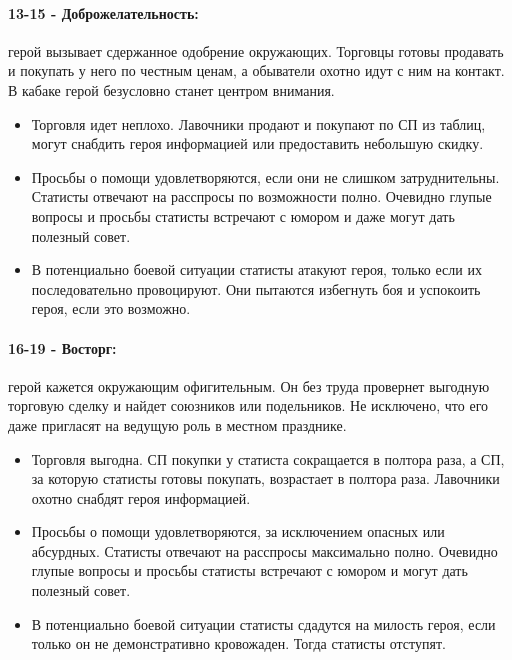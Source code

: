 \paragraph{13-15 - Доброжелательность:} герой вызывает сдержанное одобрение окружающих. Торговцы готовы продавать и покупать у него по честным ценам, а обыватели охотно идут с ним на контакт. В кабаке герой безусловно станет центром внимания.
\begin{itemize}
  \item Торговля идет неплохо. Лавочники продают и покупают по СП из таблиц, могут снабдить героя информацией или предоставить небольшую скидку.
  \item Просьбы о помощи удовлетворяются, если они не слишком затруднительны. Статисты отвечают на расспросы по возможности полно. Очевидно глупые вопросы и просьбы статисты встречают с юмором и даже могут дать полезный совет.
  \item В потенциально боевой ситуации статисты атакуют героя, только если их последовательно провоцируют. Они пытаются избегнуть боя и успокоить героя, если это возможно.
\end{itemize}
\paragraph{16-19 - Восторг:} герой кажется окружающим офигительным. Он без труда провернет выгодную торговую сделку и найдет союзников или подельников. Не исключено, что его даже пригласят на ведущую роль в местном празднике.
\begin{itemize}
  \item Торговля выгодна. СП покупки у статиста сокращается в полтора раза, а СП, за которую статисты готовы покупать, возрастает в полтора раза. Лавочники охотно снабдят героя информацией.
  \item Просьбы о помощи удовлетворяются, за исключением опасных или абсурдных. Статисты отвечают на расспросы максимально полно. Очевидно глупые вопросы и просьбы статисты встречают с юмором и могут дать полезный совет.
  \item В потенциально боевой ситуации статисты сдадутся на милость героя, если только он не демонстративно кровожаден. Тогда статисты отступят.
\end{itemize}
